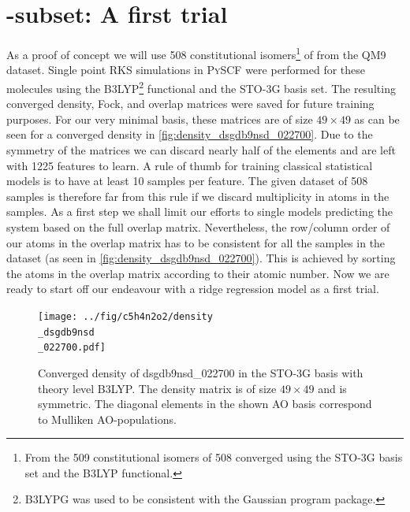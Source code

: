 \section{-subset: A first trial}
\label{sec:qm9_c5h4n2o2}
As a proof of concept we will use 508 constitutional isomers\footnote{From the 509 constitutional isomers of  508 converged using the STO-3G basis set and the B3LYP functional.} of  from the QM9 dataset. 
Single point RKS simulations in \textsc{PySCF} \parencite{ref:pyscf} were performed for these molecules using the B3LYP\footnote{B3LYPG was used to be consistent with the Gaussian program package.} functional and the STO-3G basis set. The resulting converged density, Fock, and overlap matrices were saved for future training purposes. For our very minimal basis, these matrices are of size $49 \times 49$ as can be seen for a converged density in \autoref{fig:density_dsgdb9nsd_022700}. 
Due to the symmetry of the matrices we can discard nearly half of the elements and are left with 1225 features to learn. A rule of thumb for training classical statistical models is to have at least 10 samples per feature. \parencite{ref:rule_of_10} The given dataset of 508 samples is therefore far from this rule if we discard multiplicity in atoms in the samples. As a first step we shall limit our efforts to single models predicting the system based on the full overlap matrix. Nevertheless, the row/column order of our atoms in the overlap matrix has to be consistent for all the samples in the dataset (as seen in \autoref{fig:density_dsgdb9nsd_022700}). This is achieved by sorting the atoms in the overlap matrix according to their atomic number. Now we are ready to start off our endeavour with a ridge regression model as a first trial. 
\begin{figure}[H]
    \centering
    \texttt{[image: ../fig/c5h4n2o2/density\\\_dsgdb9nsd\\\_022700.pdf]}
    \caption[Density of dsgdb9nsd\_022700 in STO-3G basis \& theory level B3LYP]{Converged density of dsgdb9nsd\_022700 in the STO-3G basis with theory level B3LYP. The density matrix is of size $49 \times 49$ and is symmetric. The diagonal elements in the shown AO basis correspond to Mulliken AO-populations. }
    \label{fig:density_dsgdb9nsd_022700}
\end{figure}

